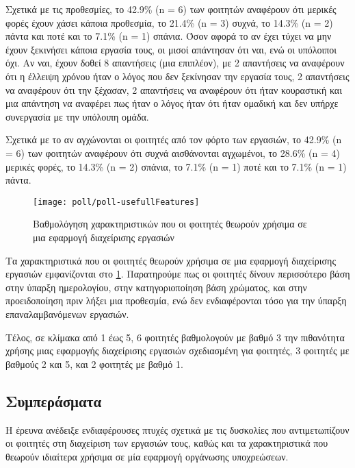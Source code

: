             Σχετικά με τις προθεσμίες, το 42.9\% (n = 6) των φοιτητών αναφέρουν ότι μερικές φορές έχουν χάσει κάποια προθεσμία, το 21.4\% (n = 3) συχνά, το 14.3\% (n = 2) πάντα και ποτέ και το 7.1\% (n = 1) σπάνια. Όσον αφορά το αν έχει τύχει να μην έχουν ξεκινήσει κάποια εργασία τους, οι μισοί απάντησαν ότι ναι, ενώ οι υπόλοιποι όχι. Αν ναι, έχουν δοθεί 8 απαντήσεις (μια επιπλέον), με 2 απαντήσεις να αναφέρουν ότι η έλλειψη χρόνου ήταν ο λόγος που δεν ξεκίνησαν την εργασία τους, 2 απαντήσεις να αναφέρουν ότι την ξέχασαν, 2 απαντήσεις να αναφέρουν ότι ήταν κουραστική και μια απάντηση να αναφέρει πως ήταν ο λόγος ήταν ότι ήταν ομαδική και δεν υπήρχε συνεργασία με την υπόλοιπη ομάδα.

            Σχετικά με το αν αγχώνονται οι φοιτητές από τον φόρτο των εργασιών, το 42.9\% (n = 6) των φοιτητών αναφέρουν ότι συχνά αισθάνονται αγχωμένοι, το 28.6\% (n = 4) μερικές φορές, το 14.3\% (n = 2) σπάνια, το 7.1\% (n = 1) ποτέ και το 7.1\% (n = 1) πάντα.

            \begin{figure}[h!] \noindent \centering
                \texttt{[image: poll/poll-usefullFeatures]}
                \caption{Βαθμολόγηση χαρακτηριστικών που οι φοιτητές θεωρούν χρήσιμα σε μια εφαρμογή διαχείρισης εργασιών}
                \label{fig:poll-usefullFeatures}
            \end{figure}

            Τα χαρακτηριστικά που οι φοιτητές θεωρούν χρήσιμα σε μια εφαρμογή διαχείρισης εργασιών εμφανίζονται στο \ref{fig:poll-usefullFeatures}. Παρατηρούμε πως οι φοιτητές δίνουν περισσότερο βάση στην ύπαρξη ημερολογίου, στην κατηγοριοποίηση βάση χρώματος, και στην προειδοποίηση πριν λήξει μια προθεσμία, ενώ δεν ενδιαφέρονται τόσο για την ύπαρξη επαναλαμβανόμενων εργασιών.

            Τέλος, σε κλίμακα από 1 έως 5, 6 φοιτητές βαθμολογούν με βαθμό 3 την πιθανότητα χρήσης μιας εφαρμογής διαχείρισης εργασιών σχεδιασμένη για φοιτητές, 3 φοιτητές με βαθμούς 2 και 5, και 2 φοιτητές με βαθμό 1.

        \subsection{Συμπεράσματα}
            Η έρευνα ανέδειξε ενδιαφέρουσες πτυχές σχετικά με τις δυσκολίες που αντιμετωπίζουν οι φοιτητές στη διαχείριση των εργασιών τους, καθώς και τα χαρακτηριστικά που θεωρούν ιδιαίτερα χρήσιμα σε μία εφαρμογή οργάνωσης υποχρεώσεων.

